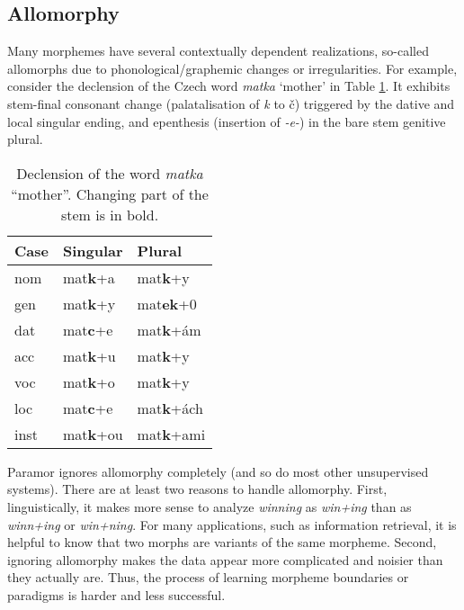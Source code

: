 \documentclass[11pt]{article}
\newcommand{\gloss}[2]{\emph{#1} ``#2''}
\newcommand{\e}[1]{\textit{#1}} %
\begin{document}

\subsection{Allomorphy}


\noindent
Many morphemes have several contextually dependent realizations,  so-called
allomorphs due to phonological/graphemic changes or irregularities. For example, consider the declension of the Czech word \e{matka} `mother' in Table \ref{table:matka}. It exhibits stem-final conso\-nant chan\-ge (palatalisation of \e{k} to \v{c}) triggered by the dative and local singular ending, and epenthesis (insertion of \e{-e-}) in the bare stem genitive plural.

\begin{table}[h]
\begin{center}
\begin{small}
\begin{tabular}{|l|ll|}
\hline \bf Case & \bf Singular & \bf Plural \\ \hline
nom & mat\textbf{k}+a & mat\textbf{k}+y \\
gen & mat\textbf{k}+y & mat\textbf{ek}+0 \\
dat & mat\textbf{c}+e & mat\textbf{k}+ám\\
acc & mat\textbf{k}+u & mat\textbf{k}+y \\
voc & mat\textbf{k}+o & mat\textbf{k}+y \\
loc & mat\textbf{c}+e & mat\textbf{k}+ách \\
inst & mat\textbf{k}+ou & mat\textbf{k}+ami \\
\hline
\end{tabular}
\end{small}
\end{center}
\caption{\label{table:matka} Declension of the word \gloss{matka}{mother}. Changing part of the stem is in bold.}
\end{table}


Paramor ignores allomorphy completely (and so do most other unsupervised systems).
%
There are at least two reasons to handle allomorphy.
%
First, linguistically,
it  makes  more  sense  to  analyze  \e{winning}  as  \e{win+ing} than as  \e{winn+ing} or \e{win+ning}. For  many  applications, such as information retrieval, it is helpful to know that two morphs are variants of the same morpheme.
%
Second, ignoring allomorphy makes the data appear more complicated and noisier than they actually are. Thus, the process of learning morpheme boundaries or paradigms is harder and less successful.
\end{document}
